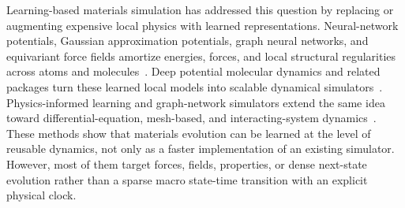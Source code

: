 \documentclass{article}
\begin{document}
Learning-based materials simulation has addressed this question by replacing or augmenting expensive local physics with learned representations. Neural-network potentials, Gaussian approximation potentials, graph neural networks, and equivariant force fields amortize energies, forces, and local structural regularities across atoms and molecules~\cite{behler2007nn,bartok2010gap,schutt2017schnet,xie2018cgcnn,batatia2022mace,gilmer2017mpnn,gasteiger2020dimenet,batzner2022nequip,musaelian2023allegro}. Deep potential molecular dynamics and related packages turn these learned local models into scalable dynamical simulators~\cite{zhang2018deeppotential,wang2018deepmdkit}. Physics-informed learning and graph-network simulators extend the same idea toward differential-equation, mesh-based, and interacting-system dynamics~\cite{raissi2019pinn,karniadakis2021piml,battaglia2016interaction,kipf2018nri,pfaff2021meshgraphnets}. These methods show that materials evolution can be learned at the level of reusable dynamics, not only as a faster implementation of an existing simulator. However, most of them target forces, fields, properties, or dense next-state evolution rather than a sparse macro state-time transition with an explicit physical clock.
\end{document}
